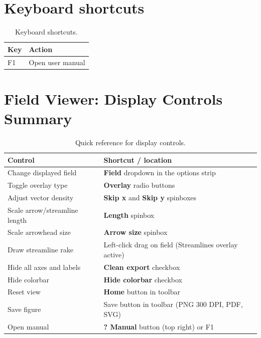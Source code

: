 \documentclass[11pt, a4paper]{report}
\newcommand{\uipth}[1]{\textbf{\textcolor{upblue}{#1}}}
\begin{document}
\section{Keyboard shortcuts}

\begin{table}[htbp]
\centering
\caption{Keyboard shortcuts.}
\begin{tabular}{ll}
\toprule
\textbf{Key} & \textbf{Action} \\
\midrule
F1 & Open user manual \\
\bottomrule
\end{tabular}
\end{table}

\section{Field Viewer: Display Controls Summary}

\begin{table}[htbp]
\centering
\caption{Quick reference for display controls.}
\begin{tabular}{ll}
\toprule
\textbf{Control} & \textbf{Shortcut / location} \\
\midrule
Change displayed field     & \uipth{Field} dropdown in the options strip \\
Toggle overlay type        & \uipth{Overlay} radio buttons \\
Adjust vector density      & \uipth{Skip x} and \uipth{Skip y} spinboxes \\
Scale arrow/streamline length & \uipth{Length} spinbox \\
Scale arrowhead size       & \uipth{Arrow size} spinbox \\
Draw streamline rake       & Left-click drag on field (Streamlines overlay active) \\
Hide all axes and labels   & \uipth{Clean export} checkbox \\
Hide colorbar              & \uipth{Hide colorbar} checkbox \\
Reset view                 & \uipth{Home} button in toolbar \\
Save figure                & Save button in toolbar (PNG 300 DPI, PDF, SVG) \\
Open manual                & \uipth{? Manual} button (top right) or F1 \\
\bottomrule
\end{tabular}
\end{table}
\end{document}

